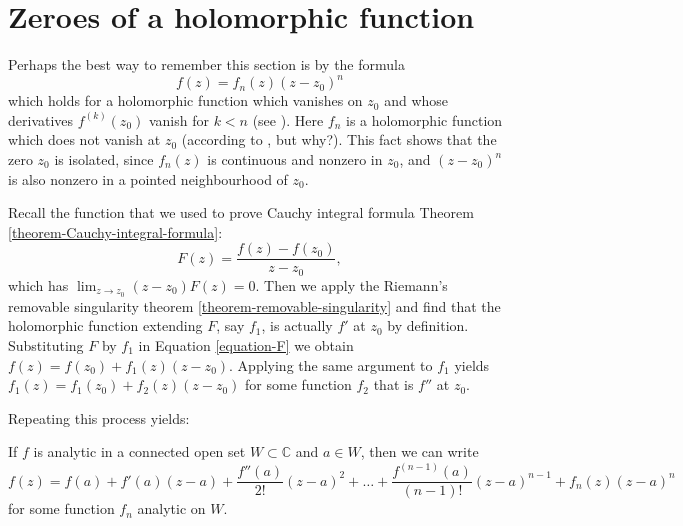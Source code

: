 \section{Zeroes of a holomorphic function}
\label{section-zeroes}

\noindent
Perhaps the best way to remember this section is by the formula
\begin{equation}
\label{equation-zero}
f(z)=f_n(z)(z-z_0)^n
\end{equation}
which holds for a holomorphic function which
vanishes on $z_0$ and whose derivatives $f^{(k)}(z_0)$ vanish
for $k<n$ (see \cite[p. 126]{Ahlfors}).
Here $f_n$ is a holomorphic function which does not vanish at $z_0$ 
(according to \cite{lec}, but why?).
This fact shows that the zero $z_0$ is isolated,
since $f_n(z)$ is continuous and nonzero in $z_0$,
and $(z-z_0)^n$ is also nonzero in a pointed neighbourhood of $z_0$.
 
\medskip\noindent
Recall the function that we used to prove Cauchy integral formula
Theorem \ref{theorem-Cauchy-integral-formula}:
\begin{equation}
\label{equation-F}
F(z)=\frac{f(z)-f(z_0)}{z-z_0},
\end{equation}
which has $\lim_{z\to z_0} (z-z_0)F(z)=0$. Then we apply the 
Riemann's removable singularity theorem \ref{theorem-removable-singularity}
and find that the holomorphic function extending $F$,
say $f_1$, is actually $f'$ at
$z_0$ by definition. 
Substituting $F$ by $f_1$
in Equation \ref{equation-F} we obtain
$f(z)=f(z_0)+f_1(z)(z-z_0)$. Applying the same
argument to $f_1$ yields $f_1(z)=f_1(z_0)+f_2(z)(z-z_0)$ for some function
$f_2$ that is $f''$ at $z_0$.

Repeating this process yields:

\begin{lemma}
\label{lemma-finite-Taylor-expansion}
\begin{reference}
\cite[Chapter 4, Section 3, Subsection 2, Theorem 8]{ahl}
\end{reference}
If $f$ is analytic in a connected open set $W\subset\mathbb{C}$ and $a \in W$,
then we can write
\begin{equation}
\label{equation-finite-Taylor-expansion}
f(z)=f(a)+f'(a)(z-a)+\frac{f''(a)}{2!}(z-a)^2+\ldots
+\frac{f^{(n-1)}(a)}{(n-1)!}(z-a)^{n-1}+f_n(z)(z-a)^n
\end{equation}
for some function $f_n$ analytic on $W$.
\end{lemma}

